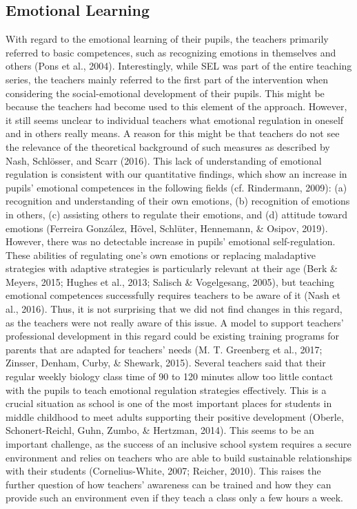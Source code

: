 \documentclass[11.5pt]{sig-alternate} %
\begin{document}
\begin{large}
\subsection*{Emotional Learning}

With regard to the emotional learning of their pupils, the teachers primarily referred to basic competences, such as recognizing emotions in themselves and others (Pons et al., 2004). Interestingly, while SEL was part of the entire teaching series, the teachers mainly referred to the first part of the intervention when considering the social-emotional development of their pupils. This might be because the teachers had become used to this element of the approach. However, it still seems unclear to individual teachers what emotional regulation in oneself and in others really means. A reason for this might be that teachers do not see the relevance of the theoretical background of such measures as described by Nash, Schlösser, and Scarr (2016). This lack of understanding of emotional regulation is consistent with our quantitative findings, which show an increase in pupils’ emotional competences in the following fields (cf. Rindermann, 2009): (a) recognition and understanding of their own emotions, (b) recognition of emotions in others, (c) assisting others to regulate their emotions, and (d) attitude toward emotions (Ferreira González, Hövel, Schlüter, Hennemann, \& Osipov, 2019). However, there was no detectable increase in pupils’ emotional self-regulation. These abilities of regulating one’s own emotions or replacing maladaptive strategies with adaptive strategies is particularly relevant at their age (Berk \& Meyers, 2015; Hughes et al., 2013; Salisch \& Vogelgesang, 2005), but teaching emotional competences successfully requires teachers to be aware of it (Nash et al., 2016). Thus, it is not surprising that we did not find changes in this regard, as the teachers were not really aware of this issue. A model to support teachers’ professional development in this regard could be existing training programs for parents that are adapted for teachers’ needs (M. T. Greenberg et al., 2017; Zinsser, Denham, Curby, \& Shewark, 2015). Several teachers said that their regular weekly biology class time of 90 to 120 minutes allow too little contact with the pupils to teach emotional regulation strategies effectively. This is a crucial situation as school is one of the most important places for students in middle childhood to meet adults supporting their positive development (Oberle, Schonert-Reichl, Guhn, Zumbo, \& Hertzman, 2014). This seems to be an important challenge, as the success of an inclusive school system requires a secure environment and relies on teachers who are able to build sustainable relationships with their students (Cornelius-White, 2007; Reicher, 2010). This raises the further question of how teachers’ awareness can be trained and how they can provide such an environment even if they teach a class only a few hours a week.


\end{large}
\end{document}

